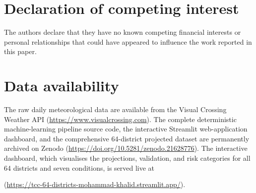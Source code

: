 \documentclass[pdflatex,sn-basic]{sn-jnl}
\begin{document}
\section*{Declaration of competing interest}
The authors declare that they have no known competing financial interests or
personal relationships that could have appeared to influence the work reported in
this paper.

\section*{Data availability}
The raw daily meteorological data are available from the Visual Crossing Weather
API (\url{https://www.visualcrossing.com}). The complete deterministic
machine-learning pipeline source code, the interactive Streamlit web-application
dashboard, and the comprehensive 64-district projected dataset are permanently
archived on Zenodo (\url{https://doi.org/10.5281/zenodo.21628776}). The
interactive dashboard, which visualises the projections, validation, and risk
categories for all 64 districts and seven conditions, is served live at

(\url{https://tcc-64-districts-mohammad-khalid.streamlit.app/}).
\end{document}
